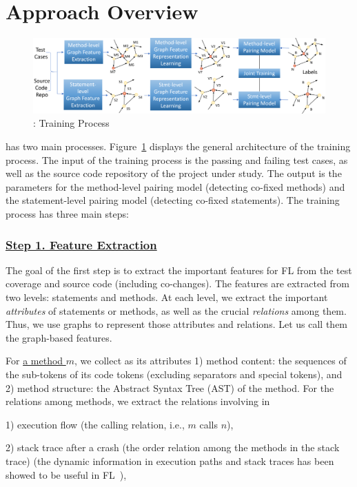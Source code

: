 \section{Approach Overview}
\label{overview:sec}

\begin{figure}[t]
	\centering
	\includegraphics[width=5.6in]{graphs/overview.png}
	\caption{{\tool}: Training Process}
	\label{train-overview}
\end{figure}

{\tool} has two main processes. Figure~\ref{train-overview} displays
the general architecture of the training process. The input of the
training process is the passing and failing test cases, as well as the
source code repository of the project under study. The output is the
parameters for the method-level pairing model (detecting co-fixed
methods) and the statement-level pairing model (detecting co-fixed
statements). The training process has three main steps:

\subsubsection*{\underline{Step 1. Feature Extraction}}
The goal of the first step is to extract the important features for FL
from the test coverage and source code (including co-changes). The
features are extracted from two levels: statements and methods. At
each level, we extract the important {\em attributes} of statements or
methods, as well as the crucial {\em relations} among them. Thus, we
use graphs to represent those attributes and relations. Let us call
them the graph-based features.

For \underline{a method $m$}, we collect as its attributes 1) method
content: the sequences of the sub-tokens of its code tokens (excluding
separators and special tokens), and 2) method structure: the Abstract
Syntax Tree (AST) of the method. For the relations among methods, we
extract the relations involving in

1) execution flow (the calling relation, i.e., $m$ calls $n$),

2) stack trace after a crash (the order relation among the methods in
the stack trace) (the dynamic information in execution paths and stack
traces has been showed to be useful in FL~\cite{icse21-fl,DeepFL}),

